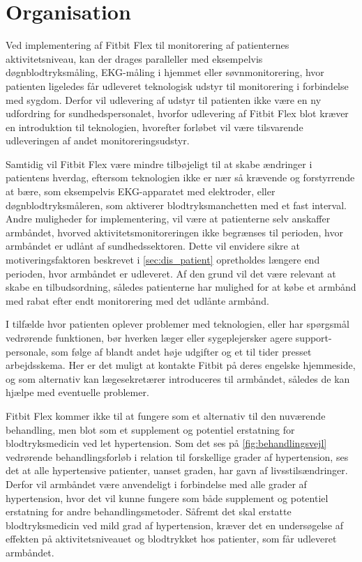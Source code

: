 \section{Organisation} \label{sec:dis_organisation}

Ved implementering af Fitbit Flex til monitorering af patienternes aktivitetsniveau, kan der drages paralleller med eksempelvis døgnblodtryksmåling, EKG-måling i hjemmet eller søvnmonitorering, hvor patienten ligeledes får udleveret teknologisk udstyr til monitorering i forbindelse med sygdom. Derfor vil udlevering af udstyr til patienten ikke være en ny udfordring for sundhedspersonalet, hvorfor udlevering af Fitbit Flex blot kræver en introduktion til teknologien, hvorefter forløbet vil være tilsvarende udleveringen af andet monitoreringsudstyr. 

Samtidig vil Fitbit Flex være mindre tilbøjeligt til at skabe ændringer i patientens hverdag, eftersom teknologien ikke er nær så krævende og forstyrrende at bære, som eksempelvis EKG-apparatet med elektroder, eller døgnblodtryksmåleren, som aktiverer blodtryksmanchetten med et fast interval. Andre muligheder for implementering, vil være at patienterne selv anskaffer armbåndet, hvorved aktivitetsmonitoreringen ikke begrænses til perioden, hvor armbåndet er udlånt af sundhedssektoren. Dette vil envidere sikre at motiveringsfaktoren beskrevet i \autoref{sec:dis_patient} opretholdes længere end perioden, hvor armbåndet er udleveret. Af den grund vil det være relevant at skabe en tilbudsordning, således patienterne har mulighed for at købe et armbånd med rabat efter endt monitorering med det udlånte armbånd.

I tilfælde hvor patienten oplever problemer med teknologien, eller har spørgsmål vedrørende funktionen, bør hverken læger eller sygeplejersker agere support-personale, som følge af blandt andet høje udgifter og et til tider presset arbejdsskema. Her er det muligt at kontakte Fitbit på deres engelske hjemmeside, og som alternativ kan lægesekretærer introduceres til armbåndet, således de kan hjælpe med eventuelle problemer.

Fitbit Flex kommer ikke til at fungere som et alternativ til den nuværende behandling, men blot som et supplement og potentiel erstatning for blodtryksmedicin ved let hypertension. Som det ses på \autoref{fig:behandlingsvejl} vedrørende behandlingsforløb i relation til forskellige grader af hypertension, ses det at alle hypertensive patienter, uanset graden, har gavn af livsstilsændringer. Derfor vil armbåndet være anvendeligt i forbindelse med alle grader af hypertension, hvor det vil kunne fungere som både supplement og potentiel erstatning for andre behandlingsmetoder. Såfremt det skal erstatte blodtryksmedicin ved mild grad af hypertension, kræver det en undersøgelse af effekten på aktivitetsniveauet og blodtrykket hos patienter, som får udleveret armbåndet.

